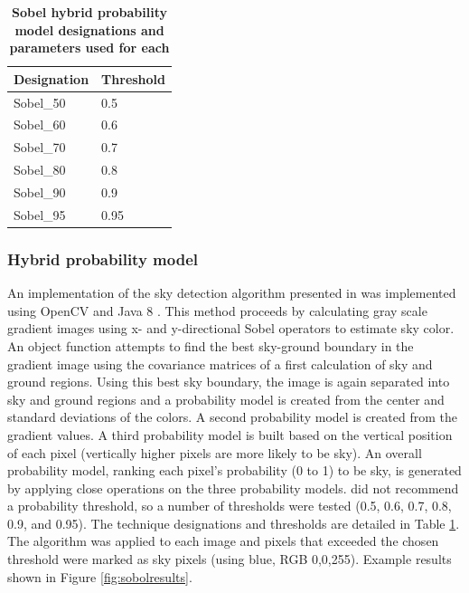 \documentclass[final,3p,times,authoryear]{elsarticle}
\begin{document}
	
\begin{table}[!htbp]
\caption{\bf Sobel hybrid probability model designations and parameters used for each  \label{tab:techniques4}}     
\begin{tabular}{ l  l }
\textbf{Designation}  & \textbf{Threshold}    \\ \hline
Sobel\_50 & 0.5 \\	  
Sobel\_60 & 0.6 \\	
Sobel\_70 & 0.7 \\	
Sobel\_80 & 0.8 \\
Sobel\_90 & 0.9 \\
Sobel\_95 & 0.95 \\
\hline
\end{tabular}
\end{table}

\subsubsection{Hybrid probability model}\label{sec:prob}
An implementation of the sky detection algorithm presented in \cite{Wang2015a} was implemented using OpenCV \citep{Bradski2000} and Java 8 \citep{Oracle2018}. This method proceeds by calculating gray scale gradient images using x- and y-directional Sobel operators to estimate sky color. An object function attempts to find the best sky-ground boundary in the gradient image using the covariance matrices of a first calculation of sky and ground regions. Using this best sky boundary, the image is again separated into sky and ground regions and a probability model is created from the center and standard deviations of the colors. A second probability model is created from the gradient values. A third probability model is built based on the vertical position of each pixel (vertically higher pixels are more likely to be sky). An overall probability model, ranking each pixel's probability (0 to 1) to be sky, is generated by applying close operations on the three probability models. \cite{Wang2015a} did not recommend a probability threshold, so a number of thresholds were tested (0.5, 0.6, 0.7, 0.8, 0.9, and 0.95). The technique designations and thresholds are detailed in Table \ref{tab:techniques4}. The algorithm was applied to each image and pixels that exceeded the chosen threshold were marked as sky pixels (using blue, RGB 0,0,255). Example results shown in Figure \ref{fig:sobolresults}.
\end{document}
